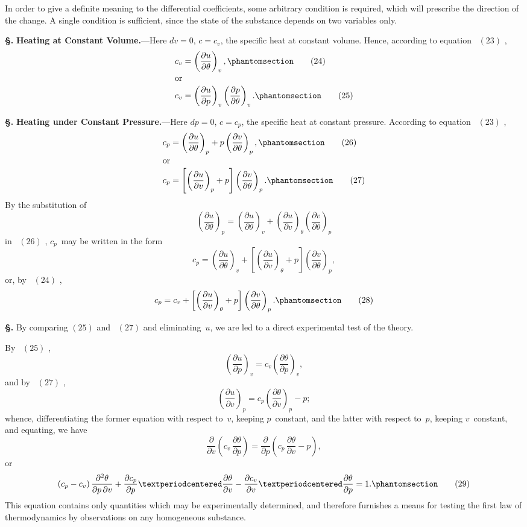 \documentclass[12pt]{book}[2005/09/16]
\newcommand{\Chg}[2]{#2}
\newcommand{\Add}[1]{\Chg{}{#1}}
\newcommand{\Section}[1]{
  \medskip\par\textbf{§\;#1}
  \label{section:#1}
}
\newcommand{\Tag}[1]{%
  \phantomsection\label{eqn:#1}\tag*{\ensuremath{#1}}%
}
\newcommand{\Eq}[1]{%
  \hyperref[eqn:#1]{\ensuremath{#1}}%
}
\newcommand{\PageSep}[1]{\ignorespaces}
\newcommand{\Topic}[1]{\textbf{#1}}
\newcommand{\dd}{\partial}
\begin{document}
In order to give a definite meaning to the differential
coefficients, some arbitrary condition is required, which will
prescribe the direction of the change. A single condition
is sufficient, since the state of the substance depends on two
variables only.

\Section{81.} \Topic{Heating at Constant Volume.}---Here $dv = 0$,
%
%
$c = c_{v}$, the specific heat at constant volume. Hence, according
%
%
to equation~\Eq{(23)},
\begin{align*}
c_{v} &= \left(\frac{\dd u}{\dd \theta}\right)_{v}\Add{,}
\Tag{(24)} \\
\intertext{or}
c_{v} &= \left(\frac{\dd u}{\dd p}\right)_{v} \left(\frac{\dd p}{\dd \theta}\right)_{v}\Add{.}
\Tag{(25)}
\end{align*}

\Section{82.} \Topic{Heating under Constant Pressure.}---Here $dp = 0$,
$c = c_{p}$, the specific heat at constant pressure. According
to equation~\Eq{(23)},
\begin{align*}
c_{p} &= \left(\frac{\dd u}{\dd \theta}\right)_{p} + p\left(\frac{\dd v}{\dd \theta}\right)_{p}\Add{,}
\Tag{(26)} \\
\intertext{or}
c_{p} &= \left[\left(\frac{\dd u}{\dd v}\right)_{p} + p\right]\left(\frac{\dd v}{\dd \theta}\right)_{p}\Add{.}
\Tag{(27)}
\end{align*}
By the substitution of
\[
\left(\frac{\dd u}{\dd \theta}\right)_{p}
  = \left(\frac{\dd u}{\dd \theta}\right)_{v}
  + \left(\frac{\dd u}{\dd v}\right)_{\theta} \left(\frac{\dd v}{\dd \theta}\right)_{p}
\]
in~\Eq{(26)}, $c_{p}$~may be written in the form
\[
c_{p} = \left(\frac{\dd u}{\dd \theta}\right)_{v}
  + \left[\left(\frac{\dd u}{\dd v}\right)_{\theta} + p\right]\left(\frac{\dd v}{\dd \theta}\right)_{p},
\]
or, by~\Eq{(24)},
\[
c_{p} = c_{v} + \left[\left(\frac{\dd u}{\dd v}\right)_{\theta} + p\right]\left(\frac{\dd v}{\dd \theta}\right)_{p}.
\Tag{(28)}
\]

\Section{83.} By comparing \Eq{(25)} and~\Eq{(27)} and eliminating~$u$, we
are led to a direct experimental test of the theory.

By~\Eq{(25)},
\[
\left(\frac{\dd u}{\dd p}\right)_{v} = c_{v} \left(\frac{\dd \theta}{\dd p}\right)_{v},
\]
and by~\Eq{(27)},
\[
\left(\frac{\dd u}{\dd v}\right)_{p} = c_{p} \left(\frac{\dd \theta}{\dd v}\right)_{p} - p;
\]
\PageSep{57}
whence, differentiating the former equation with respect to~$v$,
keeping $p$~constant, and the latter with respect to~$p$,
keeping $v$~constant, and equating, we have
\[
\frac{\dd}{\dd v}\left(c_{v}\, \frac{\dd \theta}{\dd p}\right)
  = \frac{\dd}{\dd p}\left(c_{p}\, \frac{\dd \theta}{\dd v} - p\right)\Add{,}
\]
or
\[
(c_{p} - c_{v})\, \frac{\dd^{2} \theta}{\dd p\, \dd v}
  + \frac{\dd c_{p}}{\dd p} · \frac{\dd \theta}{\dd v}
  - \frac{\dd c_{v}}{\dd v} · \frac{\dd \theta}{\dd p} = 1\Add{.}
\Tag{(29)}
\]
This equation contains only quantities which may be
experimentally determined, and therefore furnishes a means
for testing the first law of thermodynamics by observations
on any homogeneous substance.
\end{document}
